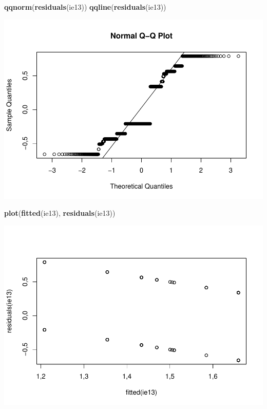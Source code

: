 \documentclass[]{article}
\newenvironment{Shaded}{\begin{snugshade}}{\end{snugshade}}
\newcommand{\KeywordTok}[1]{\textcolor[rgb]{0.13,0.29,0.53}{\textbf{#1}}}
\newcommand{\NormalTok}[1]{#1}
\begin{document}
\begin{Shaded}
\begin{Highlighting}[]
\KeywordTok{qqnorm}\NormalTok{(}\KeywordTok{residuals}\NormalTok{(ie13))}
\KeywordTok{qqline}\NormalTok{(}\KeywordTok{residuals}\NormalTok{(ie13))}
\end{Highlighting}
\end{Shaded}

\includegraphics{titanicDataClean_files/figure-latex/unnamed-chunk-25-11.pdf}

\begin{Shaded}
\begin{Highlighting}[]
\KeywordTok{plot}\NormalTok{(}\KeywordTok{fitted}\NormalTok{(ie13), }\KeywordTok{residuals}\NormalTok{(ie13))}
\end{Highlighting}
\end{Shaded}

\includegraphics{titanicDataClean_files/figure-latex/unnamed-chunk-25-12.pdf}
\end{document}
